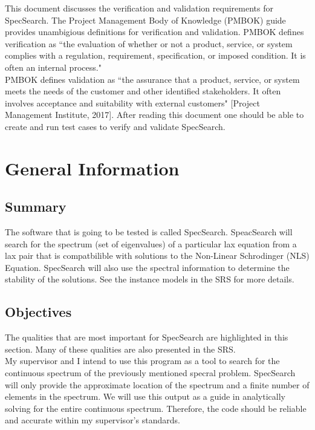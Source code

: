 \documentclass[12pt, titlepage]{article}
\begin{document}
This document discusses the verification and validation requirements for 
SpecSearch. The Project Management Body of Knowledge (PMBOK) guide provides 
unambigious definitions for verification and validation. PMBOK defines 
verification as ``the evaluation of whether or not a product, service, or 
system 
complies with a regulation, requirement, specification, or imposed condition. 
It is often an internal process." \\

PMBOK defines validation as ``the assurance that 
a product, service, or system meets the needs of the customer and other 
identified stakeholders. It often involves acceptance and suitability with 
external customers" [Project Management Institute, 2017]. After reading this 
document one should be able to create and run test cases to verify and validate 
SpecSearch. 

\section{General Information}

\subsection{Summary}

The software that is going to be tested is called SpecSearch. SpeacSearch will 
search for the 
spectrum (set of eigenvalues) of a particular lax equation from a lax pair that 
is compatbilible 
with solutions to the Non-Linear Schrodinger (NLS) Equation. SpecSearch will 
also use 
the spectral information to determine the stability of the solutions. See the 
instance models in the SRS for more details.
\subsection{Objectives}

	The qualities that are most important for SpecSearch are highlighted in 
	this section. Many of these qualities are also presented in the SRS. \\
	
	My supervisor and I intend to use this program as a tool to search for the 
	continuous spectrum of the previously mentioned specral problem. SpecSearch 
	will only provide the approximate 
	location of the spectrum and a finite number of elements in the spectrum. 
	We will 
	use this output as a guide in analytically solving for the 
	entire continuous spectrum.  Therefore, the 
	code should be reliable and accurate within my supervisor's standards. \\
	
\end{document}
